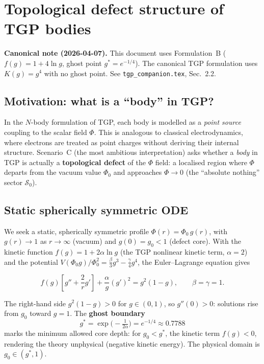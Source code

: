 
\section{Topological defect structure of TGP bodies}
\label{sec:topological_defect}

\medskip\noindent\textbf{Canonical note (2026-04-07).} This document uses Formulation~B ($f(g) = 1+4\ln g$, ghost point $g^* = e^{-1/4}$). The canonical TGP formulation uses $K(g) = g^4$ with no ghost point. See \texttt{tgp\_companion.tex}, Sec.~2.2.\medskip

\subsection{Motivation: what is a ``body'' in TGP?}

In the $N$-body formulation of TGP, each body is modelled as a
\emph{point source} coupling to the scalar field $\Phi$.  This is
analogous to classical electrodynamics, where electrons are treated as
point charges without deriving their internal structure.  Scenario~C
(the most ambitious interpretation) asks whether a \emph{body} in TGP
is actually a \textbf{topological defect} of the $\Phi$ field:
a localised region where $\Phi$ departs from the vacuum value
$\Phi_0$ and approaches $\Phi\to 0$ (the ``absolute nothing'' sector
$\mathcal{S}_0$).

\subsection{Static spherically symmetric ODE}

We seek a static, spherically symmetric profile
$\Phi(r) = \Phi_0\,g(r)$, with $g(r)\to 1$ as $r\to\infty$ (vacuum)
and $g(0)=g_0<1$ (defect core).  With the kinetic function
$f(g)=1+2\alpha\ln g$ (the TGP nonlinear kinetic term, $\alpha=2$)
and the potential
$V(\Phi_0 g)/\Phi_0^2 = \tfrac{\beta}{3}g^3 - \tfrac{\gamma}{4}g^4$,
the Euler--Lagrange equation gives

\begin{equation}
  f(g)\!\left[g'' + \frac{2}{r}g'\right]
  + \frac{\alpha}{g}(g')^2
  = g^2(1-g),
  \qquad \beta=\gamma=1.
\label{eq:defect_ode}
\end{equation}

The right-hand side $g^2(1-g)>0$ for $g\in(0,1)$, so $g''(0)>0$:
solutions rise from $g_0$ toward $g=1$.  The \textbf{ghost boundary}
\begin{equation}
  g^* = \exp\!\bigl(-\tfrac{1}{2\alpha}\bigr)
      = e^{-1/4} \approx 0.7788
\end{equation}
marks the minimum allowed core depth: for $g_0<g^*$, the kinetic term
$f(g)<0$, rendering the theory unphysical (negative kinetic energy).
The physical domain is $g_0\in(g^*,1)$.

